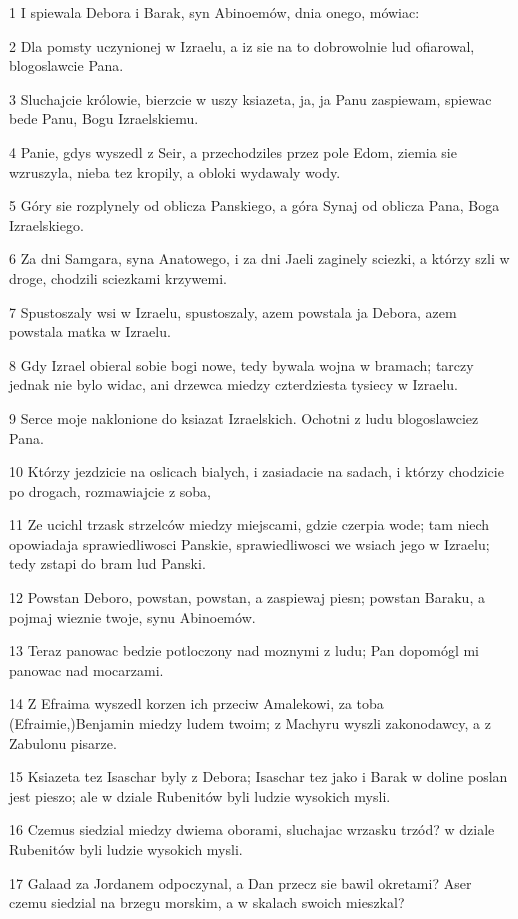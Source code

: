 \par 1 I spiewala Debora i Barak, syn Abinoemów, dnia onego, mówiac:
\par 2 Dla pomsty uczynionej w Izraelu, a iz sie na to dobrowolnie lud ofiarowal, blogoslawcie Pana.
\par 3 Sluchajcie królowie, bierzcie w uszy ksiazeta, ja, ja Panu zaspiewam, spiewac bede Panu, Bogu Izraelskiemu.
\par 4 Panie, gdys wyszedl z Seir, a przechodziles przez pole Edom, ziemia sie wzruszyla, nieba tez kropily, a obloki wydawaly wody.
\par 5 Góry sie rozplynely od oblicza Panskiego, a góra Synaj od oblicza Pana, Boga Izraelskiego.
\par 6 Za dni Samgara, syna Anatowego, i za dni Jaeli zaginely sciezki, a którzy szli w droge, chodzili sciezkami krzywemi.
\par 7 Spustoszaly wsi w Izraelu, spustoszaly, azem powstala ja Debora, azem powstala matka w Izraelu.
\par 8 Gdy Izrael obieral sobie bogi nowe, tedy bywala wojna w bramach; tarczy jednak nie bylo widac, ani drzewca miedzy czterdziesta tysiecy w Izraelu.
\par 9 Serce moje naklonione do ksiazat Izraelskich. Ochotni z ludu blogoslawciez Pana.
\par 10 Którzy jezdzicie na oslicach bialych, i zasiadacie na sadach, i którzy chodzicie po drogach, rozmawiajcie z soba,
\par 11 Ze ucichl trzask strzelców miedzy miejscami, gdzie czerpia wode; tam niech opowiadaja sprawiedliwosci Panskie, sprawiedliwosci we wsiach jego w Izraelu; tedy zstapi do bram lud Panski.
\par 12 Powstan Deboro, powstan, powstan, a zaspiewaj piesn; powstan Baraku, a pojmaj wieznie twoje, synu Abinoemów.
\par 13 Teraz panowac bedzie potloczony nad moznymi z ludu; Pan dopomógl mi panowac nad mocarzami.
\par 14 Z Efraima wyszedl korzen ich przeciw Amalekowi, za toba (Efraimie,)Benjamin miedzy ludem twoim; z Machyru wyszli zakonodawcy, a z Zabulonu pisarze.
\par 15 Ksiazeta tez Isaschar byly z Debora; Isaschar tez jako i Barak w doline poslan jest pieszo; ale w dziale Rubenitów byli ludzie wysokich mysli.
\par 16 Czemus siedzial miedzy dwiema oborami, sluchajac wrzasku trzód? w dziale Rubenitów byli ludzie wysokich mysli.
\par 17 Galaad za Jordanem odpoczynal, a Dan przecz sie bawil okretami? Aser czemu siedzial na brzegu morskim, a w skalach swoich mieszkal?
